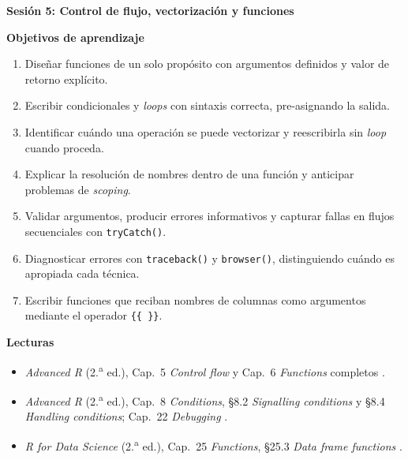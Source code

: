 \documentclass[11pt,letterpaper]{article}
\newcommand{\sesion}[2]{%
  \bigskip%
  {\color{main}\Large\bfseries Sesión #1: #2\par}%
  \smallskip%
}
\begin{document}
\sesion{5}{Control de flujo, vectorización y funciones}
\medskip
\noindent\textbf{Objetivos de aprendizaje}
\begin{enumerate}[leftmargin=*, itemsep=1pt]
    \item Diseñar funciones de un solo propósito con argumentos definidos y valor de retorno explícito.
    \item Escribir condicionales y \textit{loops} con sintaxis correcta, pre-asignando la salida.
    \item Identificar cuándo una operación se puede vectorizar y reescribirla sin \textit{loop} cuando proceda.
    \item Explicar la resolución de nombres dentro de una función y anticipar problemas de \textit{scoping}.
    \item Validar argumentos, producir errores informativos y capturar fallas en flujos secuenciales con \texttt{tryCatch()}.
    \item Diagnosticar errores con \texttt{traceback()} y \texttt{browser()}, distinguiendo cuándo es apropiada cada técnica.
    \item Escribir funciones que reciban nombres de columnas como argumentos mediante el operador \texttt{\{\{~\}\}}.
\end{enumerate}

\medskip
\noindent\textbf{Lecturas}
\begin{itemize}[leftmargin=*, itemsep=1pt]
    \item \textit{Advanced R} (2.\textsuperscript{a} ed.), Cap.\ 5 \textit{Control flow} y Cap.\ 6 \textit{Functions} completos \cite{wickham2019advr}.
    \item \textit{Advanced R} (2.\textsuperscript{a} ed.), Cap.\ 8 \textit{Conditions}, §8.2 \textit{Signalling conditions} y §8.4 \textit{Handling conditions}; Cap.\ 22 \textit{Debugging} \cite{wickham2019advr}.
    \item \textit{R for Data Science} (2.\textsuperscript{a} ed.), Cap.\ 25 \textit{Functions}, §25.3 \textit{Data frame functions} \cite{wickham2023r4ds}.
\end{itemize}
\end{document}
